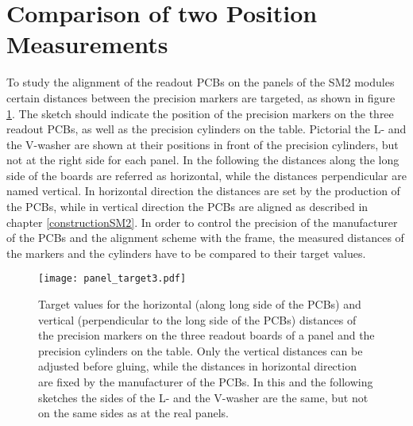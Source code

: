 \documentclass[
a4paper,                                %
twoside,                                %
BCOR1.4cm,                      %
10pt,                           %
headings=normal,                %
headsepline,                    %
clearplainpage, %
final,                                  %
div=14,
parskip=full,
openright,
bibliography=toc
]{scrreprt}
\begin{document}
\section{Comparison of two Position Measurements}

To study the alignment of the readout PCBs on the panels of the SM2 modules certain distances between the precision markers are targeted, as shown in figure \ref{panelTarget}. The sketch should indicate the position of the precision markers on the three readout PCBs, as well as the precision cylinders on the table. Pictorial the L- and the V-washer are shown at their positions in front of the precision cylinders, but not at the right side for each panel. In the following the distances along the long side of the boards are referred as horizontal, while the distances perpendicular are named vertical. In horizontal direction the distances are set by the production of the PCBs, while in vertical direction the PCBs are aligned as described in chapter \ref{constructionSM2}. In order to control the precision of the manufacturer of the PCBs and the alignment scheme with the frame, the measured distances of the markers and the cylinders have to be compared to their target values.

\begin{figure}[H]
	\centering
	\texttt{[image: panel\_target3.pdf]}
	\caption{Target values for the horizontal (along long side of the PCBs) and vertical (perpendicular to the long side of the PCBs) distances of the precision markers on the three readout boards of a panel and the precision cylinders on the table. Only the vertical distances can be adjusted before gluing, while the distances in horizontal direction are fixed by the manufacturer of the PCBs. In this and the following sketches the sides of the L- and the V-washer are the same, but not on the same sides as at the real panels.}
	\label{panelTarget}
\end{figure}
\end{document}
